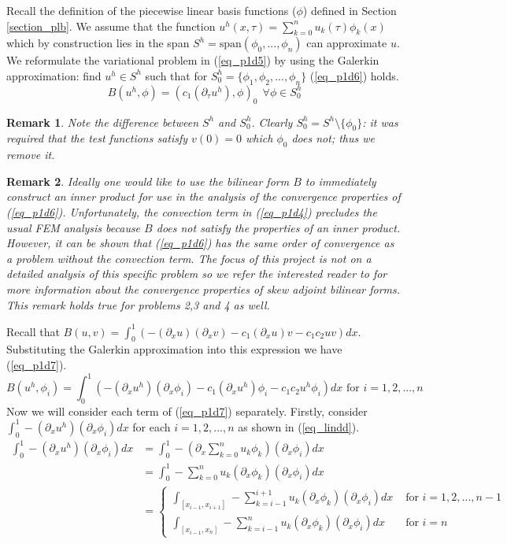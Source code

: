 \documentclass[11pt,fleqn]{article}
\theoremstyle{defstyle}
\newtheorem{rmrk}{Remark}[section]
\begin{document}
Recall the definition of the piecewise linear basis functions ($\phi$) defined in Section \ref{section_plb}. We assume that the function $u^h(x, \tau) =\sum^n_{k=0} u_k(\tau) \phi_k(x)$ which by construction lies in the span $S^h=\text{span}(\phi_0,...,\phi_n)$ can approximate $u$. We reformulate the variational problem in (\ref{eq_p1d5}) by using the Galerkin approximation: find $u^h \in S^h$ such that for $S^h_0=\{\phi_1, \phi_2,...,\phi_n \}$ (\ref{eq_p1d6}) holds.
\begin{equation}
B(u^h, \phi) = (c_1(\partial_{\tau}u^h),\phi)_0~~\forall \phi \in S^h_0
\label{eq_p1d6}
\end{equation} 
\begin{rmrk}
Note the difference between $S^h$ and $S^h_0$. Clearly $S^h_0=S^h\setminus \{\phi_0\}$: it was required that the test functions satisfy $v(0)=0$ which $\phi_0$ does not; thus we remove it. 
\end{rmrk}
\begin{rmrk}
Ideally one would like to use the bilinear form $B$ to immediately construct an inner product for use in the analysis of the convergence properties of (\ref{eq_p1d6}). Unfortunately, the convection term in (\ref{eq_p1d4}) precludes the usual \cite{vrb} FEM analysis because $B$ does not satisfy the properties of an inner product. However, it can be shown \cite{strang} that (\ref{eq_p1d6}) has the same order of convergence as a problem without the convection term. The focus of this project is not on a detailed analysis of this specific problem so we refer the interested reader to \cite{strang} for more information about the convergence properties of skew adjoint bilinear forms. This remark holds true for problems 2,3 and 4 as well.
\end{rmrk}
Recall that $B(u, v) = \int_0^1 (-(\partial_xu)(\partial_xv) - c_1(\partial_xu)v - c_1c_2uv)dx$. Substituting the Galerkin approximation into this expression we have (\ref{eq_p1d7}).
\begin{equation}
B(u^h, \phi_i) = \int_0^1 (-(\partial_xu^h)(\partial_x\phi_i) - c_1(\partial_xu^h)\phi_i - c_1c_2u^h\phi_i)dx \text{ for } i=1,2,...,n
\label{eq_p1d7}
\end{equation}
Now we will consider each term of (\ref{eq_p1d7}) separately. Firstly, consider $\int_0^1 -(\partial_xu^h)(\partial_x\phi_i)dx$ for each $i=1,2,...,n$ as shown in (\ref{eq_lindd}).
\begin{equation}
\begin{aligned}
\int_0^1 -(\partial_xu^h)(\partial_x\phi_i)dx &= \int_0^1 -(\partial_x \sum_{k=0}^{n} u_k\phi_k)(\partial_x\phi_i)dx \\
&= \int_0^1 -\sum_{k=0}^{n} u_k(\partial_x\phi_k)(\partial_x\phi_i)dx \\
&= \begin{cases}
\int_{[x_{i-1},x_{i+1}]}-\sum_{k=i-1}^{i+1} u_k(\partial_x\phi_k)(\partial_x\phi_i)dx &\text{ for } i=1,2,..., n-1 \\
\int_{[x_{i-1},x_{n}]}-\sum_{k=i-1}^{n} u_k(\partial_x\phi_k)(\partial_x\phi_i)dx &\text{ for } i=n
\end{cases}
\end{aligned}
\label{eq_lindd}
\end{equation}
\end{document}
